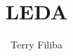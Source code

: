 \documentclass[fleqn, onecolumn]{article}
\begin{document}
\title{LEDA}
\date{}
\author{Terry Filiba}
\maketitle




\end{document}
